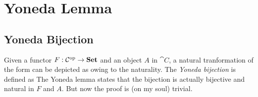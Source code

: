 \section{Yoneda Lemma}

\subsection{Yoneda Bijection}

Given a functor $F : \mathcal{C}^{\operatorname{op}} \to \boldsymbol{\mathrm{Set}}$ and an object $A$ in $\cat{C}$, %
a natural tranformation of the form
can be depicted as
owing to the naturality. The \textit{Yoneda bijection} is defined as 
The Yoneda lemma states that the bijection is actually bijective and natural in $F$ and $A$. %
But now the proof is (on my soul) trivial.


